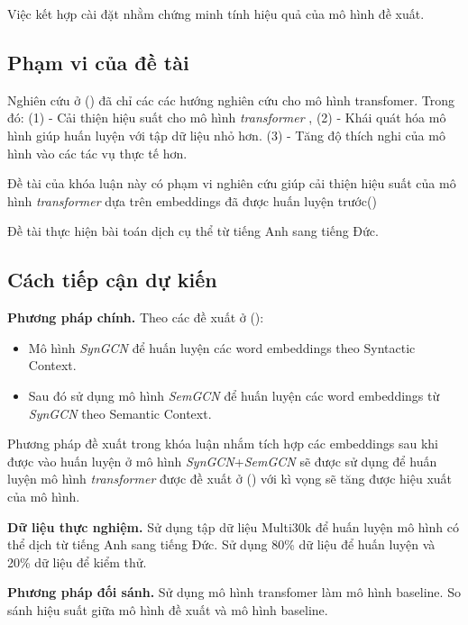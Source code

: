 \documentclass{article}[14pt]
\begin{document}
{    Việc kết hợp cài đặt nhằm chứng minh tính hiệu quả của mô hình đề xuất.
    
    \subsection{Phạm vi của đề tài}
    
    Nghiên cứu ở (\cite{transfomer-survey}) đã chỉ các các hướng nghiên cứu cho mô hình transfomer. Trong đó: (1) - Cải thiện hiệu suất cho mô hình  \textit{transformer} , (2) - Khái quát hóa mô hình giúp huấn luyện với tập dữ liệu nhỏ hơn. (3) - Tăng độ thích nghi của mô hình vào các tác vụ thực tế hơn.

    Đề tài của khóa luận này  có phạm vi nghiên cứu giúp cải thiện hiệu suất của mô hình  \textit{transformer}  dựa trên embeddings đã được huấn luyện trước(\cite{wordgcn2019})
    
    Đề tài thực hiện bài toán dịch cụ thể từ tiếng Anh sang tiếng Đức.
    
    \subsection{Cách tiếp cận dự kiến}
    
    
    \Large{\textbf{Phương pháp chính.}} Theo các đề xuất ở (\cite{wordgcn2019}):
    \begin{itemize}
        \item Mô hình \textit{SynGCN} để huấn luyện các word embeddings theo Syntactic Context.
        \item Sau đó sử dụng mô hình \textit{SemGCN} để huấn luyện các word embeddings từ \textit{SynGCN} theo Semantic Context.
    \end{itemize}  
    Phương pháp đề xuất trong khóa luận nhắm tích hợp các embeddings sau khi được vào huấn luyện ở mô hình \textit{SynGCN}+\textit{SemGCN} sẽ được sử dụng để huấn luyện mô hình  \textit{transformer}  được đề xuất ở (\cite{transformer}) với kì vọng sẽ tăng được hiệu xuất của mô hình.

    \Large{\textbf{Dữ liệu thực nghiệm.}} Sử dụng tập dữ liệu Multi30k để huấn luyện mô hình có thể dịch từ tiếng Anh sang tiếng Đức. Sử dụng 80\% dữ liệu để huấn luyện và 20\% dữ liệu để kiểm thử.

    \Large{\textbf{Phương pháp đối sánh.}} Sử dụng mô hình transfomer làm mô hình baseline. So sánh hiệu suất giữa mô hình đề xuất và mô hình baseline.

}
\end{document}
